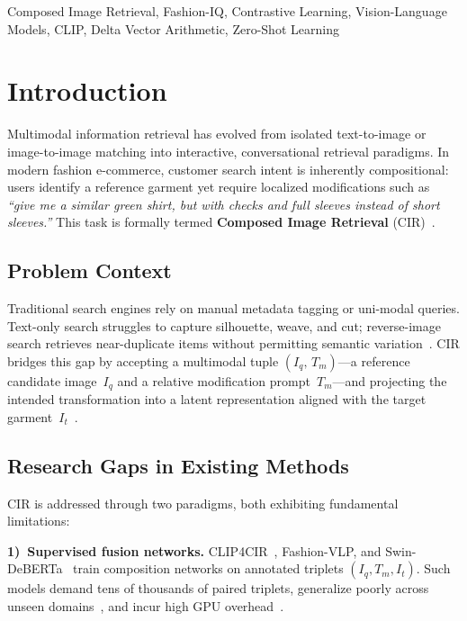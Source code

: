 \documentclass[conference]{IEEEtran}
\begin{document}
\begin{IEEEkeywords}
Composed Image Retrieval, Fashion-IQ, Contrastive Learning, Vision-Language Models, CLIP, Delta Vector Arithmetic, Zero-Shot Learning
\end{IEEEkeywords}

\section{Introduction}

Multimodal information retrieval has evolved from isolated text-to-image or image-to-image matching into interactive, conversational retrieval paradigms. In modern fashion e-commerce, customer search intent is inherently compositional: users identify a reference garment yet require localized modifications such as \textit{``give me a similar green shirt, but with checks and full sleeves instead of short sleeves.''}  This task is formally termed \textbf{Composed Image Retrieval} (CIR)~\cite{baldrati2022clip4cir, wu2021fashioniq}.

\subsection{Problem Context}
Traditional search engines rely on manual metadata tagging or uni-modal queries. Text-only search struggles to capture silhouette, weave, and cut; reverse-image search retrieves near-duplicate items without permitting semantic variation~\cite{gajic2018deepstyle, ji2020flexible, liu2016deepfashion}. CIR bridges this gap by accepting a multimodal tuple $(I_q,\,T_m)$---a reference candidate image~$I_q$ and a relative modification prompt~$T_m$---and projecting the intended transformation into a latent representation aligned with the target garment~$I_t$~\cite{baldrati2022clip4cir, wu2021fashioniq}.

\subsection{Research Gaps in Existing Methods}
CIR is addressed through two paradigms, both exhibiting fundamental limitations:

\textbf{1)~Supervised fusion networks.}  CLIP4CIR~\cite{baldrati2022clip4cir}, Fashion-VLP, and Swin-DeBERTa~\cite{zhang2023crossmodal} train composition networks on annotated triplets $(I_q,T_m,I_t)$. Such models demand tens of thousands of paired triplets, generalize poorly across unseen domains~\cite{width2023crossdomain}, and incur high GPU overhead~\cite{baidu2021product1m}.
\end{document}
